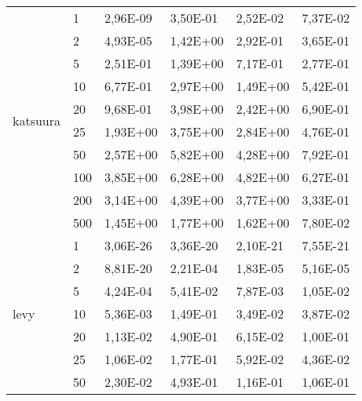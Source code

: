 \begin{longtable}[c]{|m{3.5cm}|l|l|l|l|l|}
\multirow{10}{*}{katsuura}              & 1         & 2,96E-09   & 3,50E-01   & 2,52E-02   & 7,37E-02  \\ \cline{2-6} 
                                        & 2         & 4,93E-05   & 1,42E+00   & 2,92E-01   & 3,65E-01  \\ \cline{2-6} 
                                        & 5         & 2,51E-01   & 1,39E+00   & 7,17E-01   & 2,77E-01  \\ \cline{2-6} 
                                        & 10        & 6,77E-01   & 2,97E+00   & 1,49E+00   & 5,42E-01  \\ \cline{2-6} 
                                        & 20        & 9,68E-01   & 3,98E+00   & 2,42E+00   & 6,90E-01  \\ \cline{2-6} 
                                        & 25        & 1,93E+00   & 3,75E+00   & 2,84E+00   & 4,76E-01  \\ \cline{2-6} 
                                        & 50        & 2,57E+00   & 5,82E+00   & 4,28E+00   & 7,92E-01  \\ \cline{2-6} 
                                        & 100       & 3,85E+00   & 6,28E+00   & 4,82E+00   & 6,27E-01  \\ \cline{2-6} 
                                        & 200       & 3,14E+00   & 4,39E+00   & 3,77E+00   & 3,33E-01  \\ \cline{2-6} 
                                        & 500       & 1,45E+00   & 1,77E+00   & 1,62E+00   & 7,80E-02  \\ \hline
\multirow{10}{*}{levy}                  & 1         & 3,06E-26   & 3,36E-20   & 2,10E-21   & 7,55E-21  \\ \cline{2-6} 
                                        & 2         & 8,81E-20   & 2,21E-04   & 1,83E-05   & 5,16E-05  \\ \cline{2-6} 
                                        & 5         & 4,24E-04   & 5,41E-02   & 7,87E-03   & 1,05E-02  \\ \cline{2-6} 
                                        & 10        & 5,36E-03   & 1,49E-01   & 3,49E-02   & 3,87E-02  \\ \cline{2-6} 
                                        & 20        & 1,13E-02   & 4,90E-01   & 6,15E-02   & 1,00E-01  \\ \cline{2-6} 
                                        & 25        & 1,06E-02   & 1,77E-01   & 5,92E-02   & 4,36E-02  \\ \cline{2-6} 
                                        & 50        & 2,30E-02   & 4,93E-01   & 1,16E-01   & 1,06E-01  \\ \cline{2-6} 

\end{longtable}
